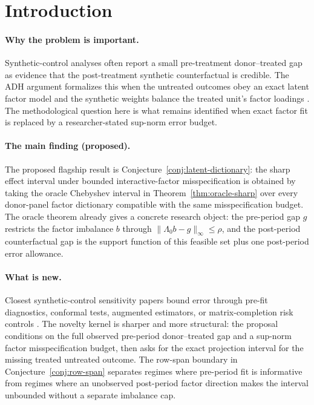 \documentclass[11pt]{article}
\theoremstyle{definition}
\theoremstyle{plain}
\theoremstyle{remark}
\begin{document}
\section{Introduction}
\paragraph{Why the problem is important.}
Synthetic-control analyses often report a small pre-treatment donor--treated gap as evidence that the post-treatment synthetic counterfactual is credible. The ADH argument formalizes this when the untreated outcomes obey an exact latent factor model and the synthetic weights balance the treated unit's factor loadings \citep{AbadieDiamondHainmueller2010,Abadie2021}. The methodological question here is what remains identified when exact factor fit is replaced by a researcher-stated sup-norm error budget.

\paragraph{The main finding (proposed).}
The proposed flagship result is Conjecture~\ref{conj:latent-dictionary}: the sharp effect interval under bounded interactive-factor misspecification is obtained by taking the oracle Chebyshev interval in Theorem~\ref{thm:oracle-sharp} over every donor-panel factor dictionary compatible with the same misspecification budget. The oracle theorem already gives a concrete research object: the pre-period gap \(g\) restricts the factor imbalance \(b\) through \(\|\Lambda_0b-g\|_\infty\le \rho\), and the post-period counterfactual gap is the support function of this feasible set plus one post-period error allowance.

\paragraph{What is new.}
Closest synthetic-control sensitivity papers bound error through pre-fit diagnostics, conformal tests, augmented estimators, or matrix-completion risk controls \citep{FermanPinto2021,FirpoPossebom2018,ChernozhukovWuthrichZhu2021,BenMichaelFellerRothstein2021,AtheyBayatiDoudchenkoImbensKhosravi2021,NazaretShiBlei2024}. The novelty kernel is sharper and more structural: the proposal conditions on the full observed pre-period donor--treated gap and a sup-norm factor misspecification budget, then asks for the exact projection interval for the missing treated untreated outcome. The row-span boundary in Conjecture~\ref{conj:row-span} separates regimes where pre-period fit is informative from regimes where an unobserved post-period factor direction makes the interval unbounded without a separate imbalance cap.
\end{document}
